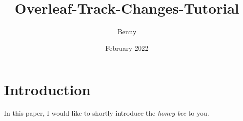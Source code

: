 \documentclass{article}
\title{Overleaf-Track-Changes-Tutorial}
\author{Benny}
\date{February 2022}
\begin{document}
\maketitle

\section{Introduction}

In this paper, I would like to shortly introduce the \textit{honey bee} to you.
\end{document}
